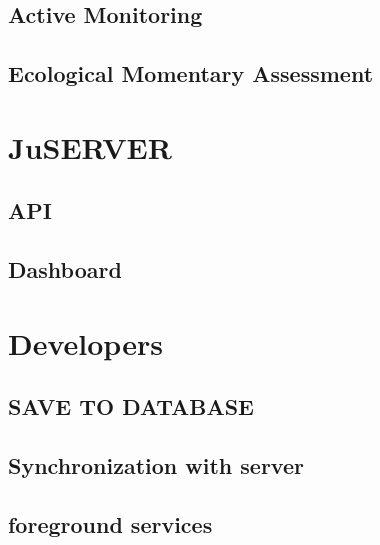 \documentclass[letterpaper,10pt,english]{sphinxmanual}
\begin{document}
\begin{DUlineblock}{0em}
\item[] 
\end{DUlineblock}


\section{Active Monitoring}
\label{\detokenize{JuTrack_Social:active-monitoring}}


\section{Ecological Momentary Assessment}
\label{\detokenize{JuTrack_Social:ecological-momentary-assessment}}


\chapter{JuSERVER}
\label{\detokenize{JuServer:juserver}}\label{\detokenize{JuServer::doc}}

\section{API}
\label{\detokenize{JuServer:api}}

\section{Dashboard}
\label{\detokenize{JuServer:dashboard}}

\chapter{Developers}
\label{\detokenize{developers:developers}}\label{\detokenize{developers::doc}}

\section{SAVE TO DATABASE}
\label{\detokenize{developers:save-to-database}}

\section{Synchronization with server}
\label{\detokenize{developers:synchronization-with-server}}

\section{foreground services}
\label{\detokenize{developers:foreground-services}}
\end{document}
